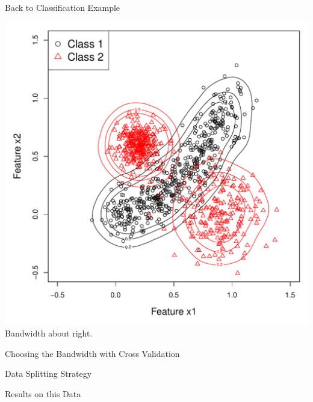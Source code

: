 \documentclass[12pt]{beamer}
\begin{document}
\begin{frame}{Back to Classification Example}

  \begin{center}
    \includegraphics[scale=0.4]{figs/kde2d2.pdf}\\
    Bandwidth about right.
  \end{center}
  
\end{frame}






\begin{frame}{Choosing the Bandwidth with Cross Validation}

\end{frame}



\begin{frame}{Data Splitting Strategy}

\end{frame}



\begin{frame}{Results on this Data}

\end{frame}
\end{document}
